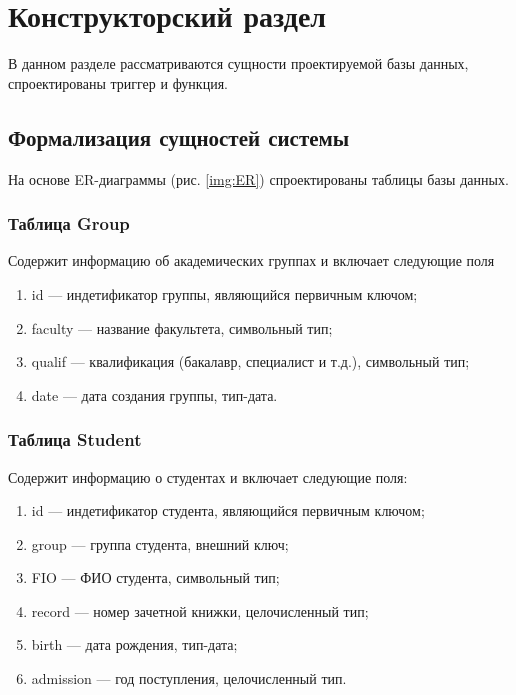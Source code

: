 \chapter{Конструкторский раздел}

В данном разделе рассматриваются сущности проектируемой базы данных, спроектированы триггер и функция.

\section{Формализация сущностей системы}
На основе ER-диаграммы (рис. \ref{img:ER}) спроектированы таблицы базы данных.

\subsection*{Таблица Group}

Содержит информацию об академических группах и включает следующие поля

\begin{enumerate}
	\item id --- индетификатор группы, являющийся первичным ключом;
	\item faculty --- название факультета, символьный тип;
	\item qualif --- квалификация (бакалавр, специалист и т.д.), символьный тип;
	\item date --- дата создания группы, тип-дата.
\end{enumerate}


\subsection*{Таблица Student}

Содержит информацию о студентах и включает следующие поля:

\begin{enumerate}
	\item id --- индетификатор студента, являющийся первичным ключом;
	\item group --- группа студента, внешний ключ;
	\item FIO --- ФИО студента, символьный тип;
	\item record --- номер зачетной книжки, целочисленный тип;
	\item birth --- дата рождения, тип-дата;
	\item admission --- год поступления, целочисленный тип.
\end{enumerate}

